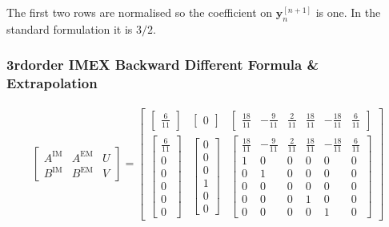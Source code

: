 \begin{notebox}
The first two rows are normalised so the coefficient on
$\boldsymbol{y}_n^{[n+1]}$ is one. In the standard formulation it is $3/2$.
\end{notebox}

\subsubsection{3rdorder IMEX Backward Different Formula \& Extrapolation}
\begin{align*}
  \left[ \begin{array}{cc|c}
  A^{\mathrm{IM}} & A^{\mathrm{EM}} & U \\
  \hline
  B^{\mathrm{IM}} & B^{\mathrm{EM}} & V
  \end{array} \right ] =
  \left[\begin{array}{cc|c}
   \left [ \begin{array}{c} \frac{6}{11} \end{array} \right ] & \left [ \begin{array}{c} 0 \end{array} \right ] &
   \left [ \begin{array}{cccccc} \frac{18}{11} & -\frac{9}{11} & \frac{2}{11} & \frac{18}{11} &  -\frac{18}{11} & \frac{6}{11} \end{array} \right ] \\
  \hline
   \left [ \begin{array}{c} \frac{6}{11}\\ 0 \\ 0 \\ 0 \\0 \\0 \end{array} \right ] & \left [ \begin{array}{c} 0 \\0 \\ 0 \\ 1 \\ 0 \\ 0 \end{array} \right ]&
   \left [ \begin{array}{cccccc} \frac{18}{11} & -\frac{9}{11} & \frac{2}{11} & \frac{18}{11} & -\frac{18}{11} & \frac{6}{11} \\ 1 & 0 & 0 & 0 & 0 & 0 \\ 0 & 1 & 0 & 0 & 0 & 0 \\ 0 & 0 & 0 & 0 & 0 & 0\\ 0 & 0 & 0 & 1 & 0 & 0 \\ 0 & 0 &  0 & 0 & 1 & 0 \end{array} \right ]
  \end{array}\right]
\end{align*}
